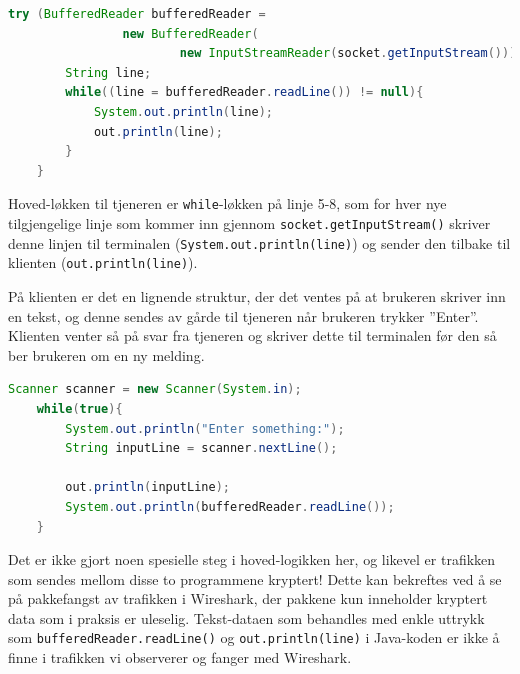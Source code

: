 \documentclass{article}
\newcommand{\code}[1]{\colorbox{light-gray}{\texttt{#1}}}
\begin{document}
\begin{lstlisting}[language=Java]
    try (BufferedReader bufferedReader = 
                new BufferedReader(
                        new InputStreamReader(socket.getInputStream()))) {
        String line;
        while((line = bufferedReader.readLine()) != null){
            System.out.println(line);
            out.println(line);
        }
    }
\end{lstlisting}

Hoved-løkken til tjeneren er \code{while}-løkken på linje 5-8, som for hver nye tilgjengelige linje som kommer inn gjennom \code{socket.getInputStream()} skriver denne linjen til terminalen (\code{System.out.println(line)}) og sender den tilbake til klienten (\code{out.println(line)}).

På klienten er det en lignende struktur, der det ventes på at brukeren skriver inn en tekst, og denne sendes av gårde til tjeneren når brukeren trykker ''Enter''. Klienten venter så på svar fra tjeneren og skriver dette til terminalen før den så ber brukeren om en ny melding.

\begin{lstlisting}[language=Java]
    Scanner scanner = new Scanner(System.in);
    while(true){
        System.out.println("Enter something:");
        String inputLine = scanner.nextLine();
        
        out.println(inputLine);
        System.out.println(bufferedReader.readLine());
    }
\end{lstlisting}

Det er ikke gjort noen spesielle steg i hoved-logikken her, og likevel er trafikken som sendes mellom disse to programmene kryptert! Dette kan bekreftes ved å se på pakkefangst av trafikken i Wireshark, der pakkene kun inneholder kryptert data som i praksis er uleselig. Tekst-dataen som behandles med enkle uttrykk som \code{bufferedReader.readLine()} og \code{out.println(line)} i Java-koden er ikke å finne i trafikken vi observerer og fanger med Wireshark.
\end{document}
